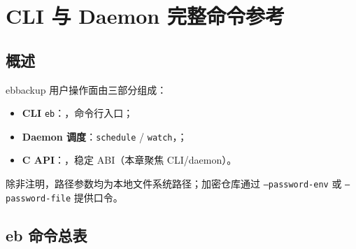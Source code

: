 \chapter{CLI 与 Daemon 完整命令参考}
\label{ch:daemon-cli-v4}

\section{概述}

ebbackup 用户操作面由三部分组成：
\begin{itemize}[nosep]
  \item \textbf{CLI} \texttt{eb}：，命令行入口；
  \item \textbf{Daemon 调度}：\texttt{schedule} / \texttt{watch}，；
  \item \textbf{C API}：，稳定 ABI（本章聚焦 CLI/daemon）。
\end{itemize}

除非注明，路径参数均为本地文件系统路径；加密仓库通过 \texttt{--password-env} 或 \texttt{--password-file} 提供口令。

\section{eb 命令总表}


